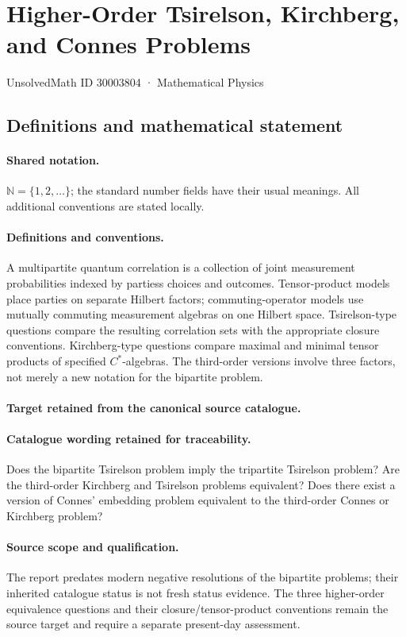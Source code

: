 \documentclass[11pt]{article}
\begin{document}
\setcounter{section}{30003803}
\section{Higher-Order Tsirelson, Kirchberg, and Connes Problems}\label{30003804}
{\small UnsolvedMath ID 30003804 · Mathematical Physics}
\subsection{Definitions and mathematical statement}

\paragraph{Shared notation.}$\mathbb N=\{1,2,\ldots\}$; the standard number fields have their usual meanings. All additional conventions are stated locally.


\paragraph{Definitions and conventions.}
A multipartite quantum correlation is a collection of joint measurement probabilities indexed by parties\textquotesingle s choices and outcomes. Tensor-product models place parties on separate Hilbert factors; commuting-operator models use mutually commuting measurement algebras on one Hilbert space. Tsirelson-type questions compare the resulting correlation sets with the appropriate closure conventions. Kirchberg-type questions compare maximal and minimal tensor products of specified $C^*$-algebras. The third-order versions involve three factors, not merely a new notation for the bipartite problem.

\paragraph{Target retained from the canonical source catalogue.}
\paragraph{Catalogue wording retained for traceability.}
Does the bipartite Tsirelson problem imply the tripartite Tsirelson problem? Are the third-order Kirchberg and Tsirelson problems equivalent? Does there exist a version of Connes' embedding problem equivalent to the third-order Connes or Kirchberg problem?

\paragraph{Source scope and qualification.}
The report predates modern negative resolutions of the bipartite problems; their inherited catalogue status is not fresh status evidence. The three higher-order equivalence questions and their closure/tensor-product conventions remain the source target and require a separate present-day assessment.
\end{document}
